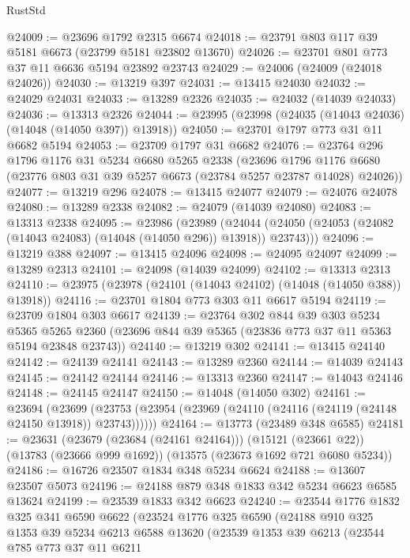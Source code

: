 \begin{lexlean}{RustStd}
\begin{coremodule}
@24009 := @23696 @1792 @2315 @6674
@24018 := @23791 @803 @117 @39 @5181 @6673 (@23799 @5181 @23802 @13670)
@24026 := @23701 @801 @773 @37 @11 @6636 @5194 @23892 @23743
@24029 := @24006 (@24009 (@24018 @24026))
@24030 := @13219 @397
@24031 := @13415 @24030
@24032 := @24029 @24031
@24033 := @13289 @2326
@24035 := @24032 (@14039 @24033)
@24036 := @13313 @2326
@24044 := @23995 (@23998 (@24035 (@14043 @24036) (@14048 (@14050 @397)) @13918))
@24050 := @23701 @1797 @773 @31 @11 @6682 @5194
@24053 := @23709 @1797 @31 @6682
@24076 := @23764
    @296
    @1796
    @1176
    @31
    @5234
    @6680
    @5265
    @2338
    (@23696 @1796 @1176 @6680 (@23776 @803 @31 @39 @5257 @6673 (@23784 @5257 @23787 @14028) @24026))
@24077 := @13219 @296
@24078 := @13415 @24077
@24079 := @24076 @24078
@24080 := @13289 @2338
@24082 := @24079 (@14039 @24080)
@24083 := @13313 @2338
@24095 := @23986
    (@23989
      (@24044 (@24050 (@24053 (@24082 (@14043 @24083) (@14048 (@14050 @296)) @13918)) @23743)))
@24096 := @13219 @388
@24097 := @13415 @24096
@24098 := @24095 @24097
@24099 := @13289 @2313
@24101 := @24098 (@14039 @24099)
@24102 := @13313 @2313
@24110 := @23975 (@23978 (@24101 (@14043 @24102) (@14048 (@14050 @388)) @13918))
@24116 := @23701 @1804 @773 @303 @11 @6617 @5194
@24119 := @23709 @1804 @303 @6617
@24139 := @23764
    @302
    @844
    @39
    @303
    @5234
    @5365
    @5265
    @2360
    (@23696 @844 @39 @5365 (@23836 @773 @37 @11 @5363 @5194 @23848 @23743))
@24140 := @13219 @302
@24141 := @13415 @24140
@24142 := @24139 @24141
@24143 := @13289 @2360
@24144 := @14039 @24143
@24145 := @24142 @24144
@24146 := @13313 @2360
@24147 := @14043 @24146
@24148 := @24145 @24147
@24150 := @14048 (@14050 @302)
@24161 := @23694
    (@23699 (@23753 (@23954 (@23969 (@24110 (@24116 (@24119 (@24148 @24150 @13918)) @23743))))))
@24164 := @13773 (@23489 @348 @6585)
@24181 := @23631
    (@23679 (@23684 (@24161 @24164)))
    (@15121 (@23661 @22))
    (@13783 (@23666 @999 @1692))
    (@13575 (@23673 @1692 @721 @6080 @5234))
@24186 := @16726 @23507 @1834 @348 @5234 @6624
@24188 := @13607 @23507 @5073
@24196 := @24188 @879 @348 @1833 @342 @5234 @6623 @6585 @13624
@24199 := @23539 @1833 @342 @6623
@24240 := @23544
    @1776
    @1832
    @325
    @341
    @6590
    @6622
    (@23524
      @1776
      @325
      @6590
      (@24188
        @910
        @325
        @1353
        @39
        @5234
        @6213
        @6588
        @13620
        (@23539
          @1353
          @39
          @6213
          (@23544
            @785
            @773
            @37
            @11
            @6211

\end{coremodule}
\end{lexlean}
